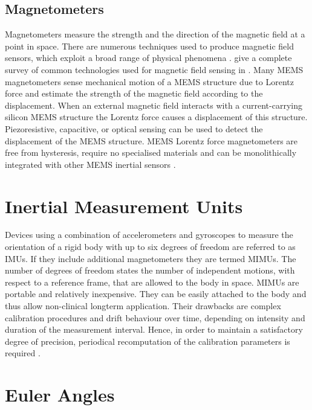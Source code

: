 \subsection{Magnetometers}

Magnetometers measure the strength and the direction of the magnetic field at a point in space. There are numerous techniques used to produce magnetic field sensors, which exploit a broad range of physical phenomena \cite{lenz_magnetic_2006}. \citeauthor{lenz_magnetic_2006} give a complete survey of common technologies used for magnetic field sensing in \cite{lenz_magnetic_2006}. Many \gls{MEMS} magnetometers sense mechanical motion of a MEMS structure due to Lorentz force and estimate the strength of the magnetic field according to the displacement. When an external magnetic field interacts with a current-carrying silicon MEMS structure the Lorentz force causes a displacement of this structure. Piezoresistive, capacitive, or optical sensing can be used to detect the displacement of the MEMS structure. MEMS Lorentz force magnetometers are free from hysteresis, require no specialised materials and can be monolithically integrated with other MEMS inertial sensors \cite{thompson_lorentz_2011}.

\section{Inertial Measurement Units}

Devices using a combination of accelerometers and gyroscopes to measure the orientation of a rigid body with up to six degrees of freedom are referred to as \glspl{IMU}. If they include additional magnetometers they are termed \glspl{MIMU}. The number of degrees of freedom states the number of independent motions, with respect to a reference frame, that are allowed to the body in space. \glspl{MIMU} are portable and relatively inexpensive. They can be easily attached to the body and thus allow non-clinical longterm application. Their drawbacks are complex calibration procedures and drift behaviour over time, depending on intensity and duration of the measurement interval. Hence, in order to maintain a satisfactory degree of precision, periodical recomputation of the calibration parameters is required \cite{olivares_vicente_signal_2013}.

\section{Euler Angles}

